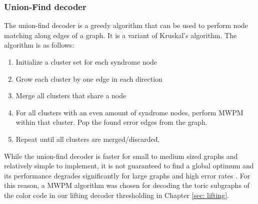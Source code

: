 \subsubsection{Union-Find decoder}
The union-find decoder is a greedy algorithm that
can be used to perform node matching along edges of a graph.
It is a variant of Kruskal's algorithm.
The algorithm is as follows:
\begin{enumerate}
    \item Initialize a cluster set for each syndrome node
    \item Grow each cluster by one edge in each direction
    \item Merge all clusters that share a node
    \item For all clusters with an even amount of syndrome nodes,
    perform MWPM within that cluster. Pop the found error edges from
    the graph.
    \item Repeat until all clusters are merged/discarded.
\end{enumerate}

While the union-find decoder is faster for small to medium
sized graphs and relatively simple to implement,
 it is not guaranteed to find a global optimum
and its performance degrades significantly for large
graphs and high error rates \cite{UFDecoder}.
For this reason, a MWPM algorithm was chosen for decoding the toric
subgraphs of the color code in our lifting decoder thresholding
in Chapter \ref{sec: lifting}.